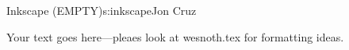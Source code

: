 \begin{aosachapter}{Inkscape (EMPTY)}{s:inkscape}{Jon Cruz}

Your text goes here---pleaes look at wesnoth.tex for formatting ideas.

\end{aosachapter}
